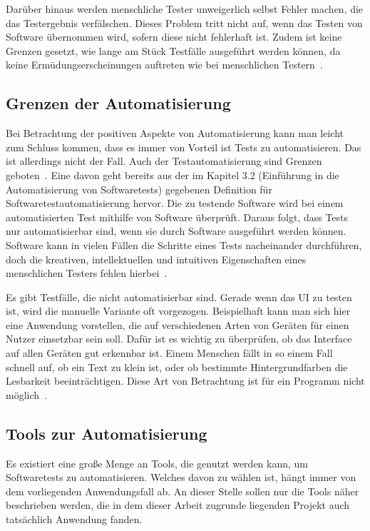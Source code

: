 Darüber hinaus werden menschliche Tester unweigerlich selbst Fehler machen, die das Testergebnis verfälschen. Dieses Problem tritt nicht auf, wenn das Testen von Software übernommen wird, sofern diese nicht fehlerhaft ist. Zudem ist keine Grenzen gesetzt, wie lange am Stück Testfälle ausgeführt werden können, da keine Ermüdungserscheinungen auftreten wie bei menschlichen Testern~\cite{Patton.2005}.


\subsection{Grenzen der Automatisierung}
Bei Betrachtung der positiven Aspekte von Automatisierung kann man leicht zum Schluss kommen, dass es immer von Vorteil ist Tests zu automatisieren. Das ist allerdings nicht der Fall. Auch der Testautomatisierung sind Grenzen geboten~\cite{Patton.2005}. Eine davon geht bereits aus der im Kapitel 3.2 (Einführung in die Automatisierung von Softwaretests) gegebenen Definition für Softwaretestautomatisierung hervor. Die zu testende Software wird bei einem automatisierten Test mithilfe von Software überprüft. Daraus folgt, dass Tests nur automatisierbar sind, wenn sie durch Software ausgeführt werden können. Software kann in vielen Fällen die Schritte eines Tests nacheinander durchführen, doch die kreativen, intellektuellen und intuitiven Eigenschaften eines menschlichen Testers fehlen hierbei~\cite{Bucsics.2015}. 
\newline


Es gibt Testfälle, die nicht automatisierbar sind. Gerade wenn das \ac{UI} zu testen ist, wird die manuelle Variante oft vorgezogen. Beispielhaft kann man sich hier eine Anwendung vorstellen, die auf verschiedenen Arten von Geräten für einen Nutzer einsetzbar sein soll. Dafür ist es wichtig zu überprüfen, ob das Interface auf allen Geräten gut erkennbar ist. Einem Menschen fällt in so einem Fall schnell auf, ob ein Text zu klein ist, oder ob bestimmte Hintergrundfarben die Lesbarkeit beeinträchtigen. Diese Art von Betrachtung ist für ein Programm nicht möglich~\cite{Bucsics.2015}.

\subsection{Tools zur Automatisierung}
Es existiert eine große Menge an Tools, die genutzt werden kann, um Softwaretests zu automatisieren. Welches davon zu wählen ist, hängt immer von dem vorliegenden Anwendungsfall ab. An dieser Stelle sollen nur die Tools näher beschrieben werden, die in dem dieser Arbeit zugrunde liegenden Projekt auch tatsächlich Anwendung fanden.

